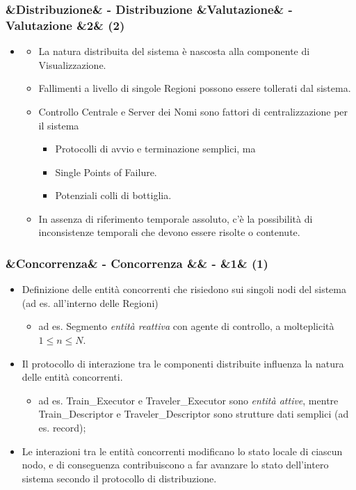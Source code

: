 \documentclass[slidestop,compress,blackandwhite]{beamer}
\newcommand{\ii}[1]{\textit{#1}}
\newcommand{\cm}[1]{\vspace{#1cm}}
\newcommand{\newtitle}[4]{
	#1 
	\ifx&#2&%
	\else
  		\large- #2
	\fi
	\ifx&#3&%
	\else
  		\normalsize- #3
	\fi
	\ifx&#4&%
	\else
  		\normalsize (#4)
	\fi
}
\newcommand{\newframe}[5]{
	\begin{frame}
		\frametitle{\newtitle{#1}{#2}{#3}{#4}}
		#5
	\end{frame}
}
\newcommand{\myitemize}[1]{
	\begin{itemize}\itemsep4pt
	#1
	\end{itemize}
}
\begin{document}
	\newframe{}{Distribuzione}{Valutazione}{2}{
		\myitemize {
			\item[] %
				\myitemize {
						\item La natura distribuita del sistema è nascosta alla componente di Visualizzazione.
						\item Fallimenti a livello di singole Regioni possono essere tollerati dal sistema.
						\item Controllo Centrale e Server dei Nomi sono fattori di centralizzazione per il sistema \\
							\myitemize {
								\item Protocolli di avvio e terminazione semplici, ma
								\item Single Points of Failure.
								\item Potenziali colli di bottiglia.
							}
						
						\item In assenza di riferimento temporale assoluto, c'è la possibilità di inconsistenze temporali che devono essere risolte o contenute.
						
				}
		}
	}
	
	
	\newframe{}{Concorrenza}{}{1}{
		\justifying
		\cm{0.4}
		\myitemize {
			\item Definizione delle entità concorrenti che risiedono sui singoli nodi del sistema (ad es. all'interno delle Regioni)
			\myitemize{
					\item ad es. Segmento {\em entità reattiva} con agente di controllo, a molteplicità $1\le n\le N$.
				}
			\item Il protocollo di interazione tra le componenti distribuite influenza la natura delle entità concorrenti.
				\myitemize {
					\item ad es. Train\_Executor e Traveler\_Executor sono {\em entità attive}, mentre Train\_Descriptor e Traveler\_Descriptor sono strutture dati semplici (ad es. record);
				}	
			\item \justifying Le interazioni tra le entità concorrenti modificano lo stato locale di ciascun nodo, e di conseguenza contribuiscono a far avanzare lo stato dell'intero sistema secondo il protocollo di distribuzione.
		}
	}
	
\end{document}
